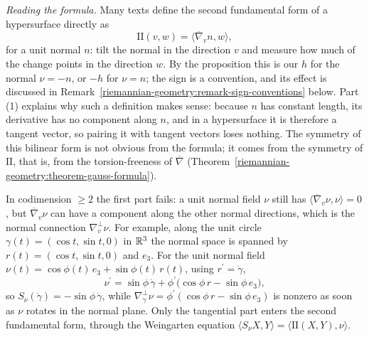 \begin{remark}\label{riemannian-geometry:remark-normal-derivative}
\emph{Reading the formula.} Many texts define the second fundamental form of a hypersurface directly as
\[
\mathrm{II}(v, w) = \langle\overline{\nabla}_vn, w\rangle ,
\]
for a unit normal $n$: tilt the normal in the direction $v$ and measure how much of the change points in the direction $w$. By the proposition this is our $h$ for the normal $\nu = -n$, or $-h$ for $\nu = n$; the sign is a
convention, and its effect is discussed in Remark~\ref{riemannian-geometry:remark-sign-conventions} below. Part (1) explains why such a definition makes sense: because $n$ has constant length, its derivative has no component
along $n$, and in a hypersurface it is therefore a tangent vector, so pairing it with tangent vectors loses nothing. The symmetry of this bilinear form is not obvious from the formula; it comes from the symmetry of
$\mathrm{II}$, that is, from the torsion-freeness of $\overline{\nabla}$ (Theorem~\ref{riemannian-geometry:theorem-gauss-formula}).

In codimension $\geq 2$ the first part fails: a unit normal field $\nu$ still has $\langle\overline{\nabla}_v\nu, \nu\rangle = 0$, but $\overline{\nabla}_v\nu$ can have a component along the other normal directions, which is the normal connection
$\nabla^\perp_v\nu$. For example, along the unit circle $\gamma(t) = (\cos t, \sin t, 0)$ in $\mathbb{R}^3$ the normal space is spanned by $r(t) = (\cos t, \sin t, 0)$ and $e_3$. For the unit normal field
$\nu(t) = \cos\phi(t)\,e_3 + \sin\phi(t)\,r(t)$, using $r^{\prime} = \dot\gamma$,
\[
\nu^{\prime} = \sin\phi\,\dot\gamma + \phi^{\prime}\bigl(\cos\phi\,r - \sin\phi\,e_3\bigr),
\]
so $S_\nu(\dot\gamma) = -\sin\phi\,\dot\gamma$, while $\nabla^\perp_{\dot\gamma}\nu = \phi^{\prime}(\cos\phi\,r - \sin\phi\,e_3)$ is nonzero as soon as $\nu$ rotates in the normal plane. Only the tangential part enters the second fundamental
form, through the Weingarten equation $\langle S_\nu X, Y\rangle = \langle\mathrm{II}(X, Y), \nu\rangle$.
\end{remark}

